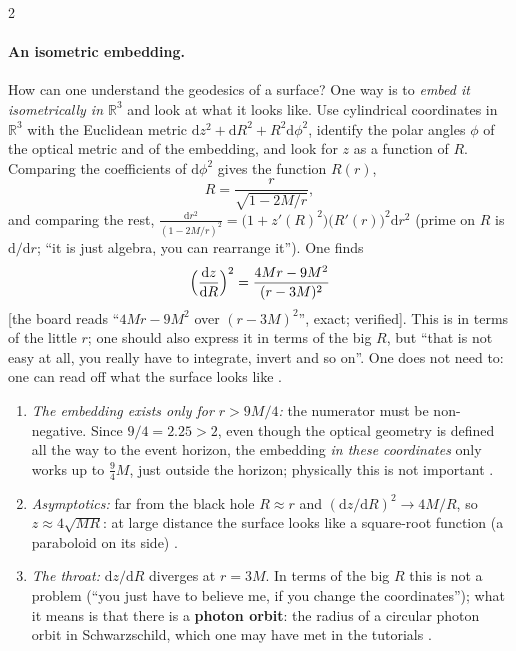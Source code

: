 \begin{paracol}{2}
\paragraph{An isometric embedding.} How can one understand the geodesics of a surface? One way is to \emph{embed it isometrically in $\mathbb R^3$} and look at what it looks like. Use cylindrical coordinates in $\mathbb R^3$ with the Euclidean metric $\mathrm dz^2+\mathrm dR^2+R^2\mathrm d\phi^2$, identify the polar angles $\phi$ of the optical metric and of the embedding, and look for $z$ as a function of $R$. Comparing the coefficients of $\mathrm d\phi^2$ gives the function $R(r)$,
\[
  R=\frac{r}{\sqrt{1-2M/r}},
\]
and comparing the rest, $\frac{\mathrm dr^2}{(1-2M/r)^2}=\bigl(1+z'(R)^2\bigr)\bigl(R'(r)\bigr)^2\mathrm dr^2$ (prime on $R$ is $\mathrm d/\mathrm dr$; ``it is just algebra, you can rearrange it''). One finds
\[
  \Bigl(\frac{\mathrm dz}{\mathrm dR}\Bigr)^2=\frac{4Mr-9M^2}{(r-3M)^2}
\]
[the board reads ``$4Mr-9M^2$ over $(r-3M)^2$'', exact; verified]. This is in terms of the little $r$; one should also express it in terms of the big $R$, but ``that is not easy at all, you really have to integrate, invert and so on''. One does not need to: one can read off what the surface looks like .
\begin{enumerate}
  \item \emph{The embedding exists only for $r>9M/4$:} the numerator must be non-negative. Since $9/4=2.25>2$, even though the optical geometry is defined all the way to the event horizon, the embedding \emph{in these coordinates} only works up to $\tfrac94M$, just outside the horizon; physically this is not important .
  \item \emph{Asymptotics:} far from the black hole $R\approx r$ and $(\mathrm dz/\mathrm dR)^2\to4M/R$, so $z\approx4\sqrt{MR}$: at large distance the surface looks like a square-root function (a paraboloid on its side) .
  \item \emph{The throat:} $\mathrm dz/\mathrm dR$ diverges at $r=3M$. In terms of the big $R$ this is not a problem (``you just have to believe me, if you change the coordinates''); what it means is that there is a \textbf{photon orbit}: the radius of a circular photon orbit in Schwarzschild, which one may have met in the tutorials .

\end{enumerate}
\end{paracol}
